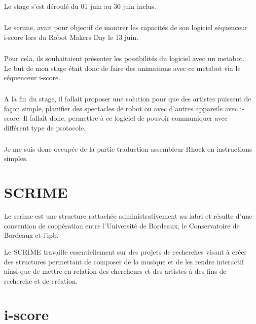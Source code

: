 \documentclass[10pt,a4paper]{report}
\begin{document}
\paragraph{}
Le stage s'est déroulé du 01 juin au 30 juin inclus.
\paragraph{}
Le \acrfull{scrime}, avait pour objectif de montrer les capacités de son logiciel séquenceur i-score lors du Robot Makers Day le 13 juin. 
\paragraph{}
Pour cela, ils souhaitaient présenter les possibilités du logiciel avec un metabot. Le but de mon stage était donc de faire des animations avec ce metabot via le séquenceur i-score. 
\paragraph{}
A la fin du stage, il fallait proposer une solution pour que des artistes puissent de façon simple, planifier des spectacles de robot ou avec d'autres appareils avec i-score. Il fallait donc, permettre à ce logiciel de pouvoir communiquer avec différent type de protocole.
\paragraph{}
Je me suis donc occupée de la partie traduction assembleur Rhock en instructions simples.



\chapter{SCRIME}
Le \acrshort{scrime} est une structure rattachée administrativement au  \acrfull{labri} et résulte d'une convention de coopération entre l'Université de Bordeaux, le Conservatoire de Bordeaux et l'\acrfull{ipb}.

Le SCRIME travaille essentiellement sur des projets de recherches visant à créer des structures permettant de composer de la musique et de les rendre interactif ainsi que  de mettre en relation des chercheurs et des artistes à des fins de recherche et de création.

\chapter{i-score}
\end{document}
